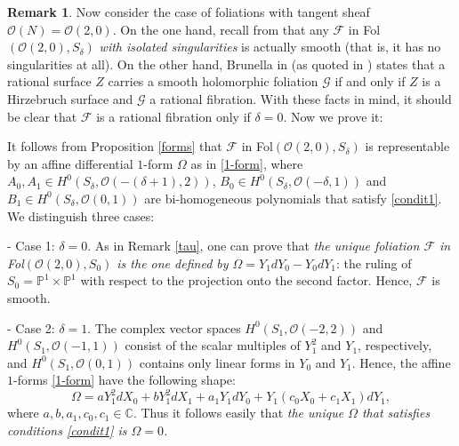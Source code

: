 \documentclass{amsart} %
\theoremstyle{definition}
\newtheorem{remark}[theorem]{Remark}
\newcommand{\CC}{\mathbb{C}}
\newcommand{\mcL}{\mathcal{L}}
\newcommand{\mcO}{\mathcal{O}}
\newcommand{\mcF}{\mathcal{F}}
\begin{document}
\begin{remark}\label{ene}
Now consider the case of foliations with tangent sheaf $\mcO(N)=\mcO(2,0)$. On the one hand, recall
from \cite[Proposition 2.4]{Gomez-Mont} that any $ \mcF $ in Fol$(\mcO(2,0), S_{\delta})$
\textit{with isolated singularities} is actually smooth (that is, it has no singularities at all).
On the other hand, Brunella in \cite{Brunella} (as quoted in \cite{L-P}) states that a rational
surface $ Z $ carries a smooth holomorphic foliation $\mathcal{G}$ if and only if $Z$ is a Hirzebruch
surface and $\mathcal{G}$ a rational fibration. With these facts in mind, it should be clear that
$ \mcF $ is a rational fibration only if $ \delta = 0 $. Now we prove it:


It follows from Proposition \ref{forms} that $\mathcal F$ in Fol$(\mcO(2,0), S_{\delta})$ is
representable by an affine differential $1$-form $ \Omega $ as in \eqref{1-form},
where
 $ A_0,A_1 \in H^0( S_{\delta}, \mcO(-(\delta+1),2) ) $,
 $ B_0 \in H^0( S_{\delta}, \mcO(-\delta,1) ) $ and
 $ B_1 \in H^0( S_{\delta}, \mcO(0,1) ) $
 are bi-homogeneous polynomials that satisfy \eqref{condit1}. We distinguish three cases:

- Case 1: $\delta=0 $. As in Remark \ref{tau}, one can prove
 that {\it the unique foliation $ \mcF $ in {\rm Fol}$(\mcO(2,0), S_{0})$ is the one defined by
 $ \Omega = Y_1 dY_0 - Y_0 dY_1 $}: the ruling of
 $ S_{0}=\mathbb{P}^1\times \mathbb{P}^1$ with respect to the projection onto the second factor.
 Hence, $ \mcF $ is smooth.

- Case 2: $\delta=1 $. The complex vector spaces $ H^0( S_{1}, \mcO(-2,2) ) $ and
 $ H^0( S_{1}, \mcO(-1,1) ) $ consist of
 the scalar multiples of $ Y_1^2 $ and $ Y_1 $, respectively, and
 $ H^0( S_{1}, \mcO(0,1) ) $ contains only linear forms in $ Y_0 $ and $ Y_1 $. Hence, the affine $1$-forms
 \eqref{1-form} have the following shape:
 $$ \Omega = a Y_1^2 dX_0 + b Y_1^2 dX_1 + a_1 Y_1 dY_0 + Y_1 ( c_0 X_0 + c_1 X_1 ) dY_1, $$
where $ a, b, a_1, c_0, c_1 \in \CC $. Thus it follows easily that {\it the unique
 $ \Omega $ that satisfies conditions \eqref{condit1} is $ \Omega = 0 $.}


\end{remark}
\end{document}
